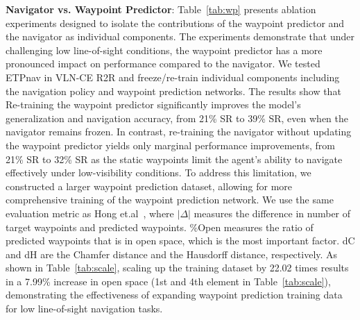 

\noindent\textbf{Navigator vs. Waypoint Predictor}:
Table~\ref{tab:wp} presents ablation experiments designed to isolate the contributions of the waypoint predictor and the navigator as individual components. The experiments demonstrate that under challenging low line-of-sight conditions, the waypoint predictor has a more pronounced impact on performance compared to the navigator. We tested ETPnav in VLN-CE R2R and freeze/re-train individual components including the navigation policy and waypoint prediction networks. The results show that Re-training the waypoint predictor significantly improves the model’s generalization and navigation accuracy, from 21\% SR to 39\% SR, even when the navigator remains frozen. In contrast, re-training the navigator without updating the waypoint predictor yields only marginal performance improvements, from 21\% SR to 32\% SR as the static waypoints limit the agent's ability to navigate effectively under low-visibility conditions. To address this limitation, we constructed a larger waypoint prediction dataset, allowing for more comprehensive training of the waypoint prediction network. We use the same evaluation metric as Hong et.al~\cite{hong2022bridging}, where $\mid$$\Delta$$\mid$ measures the difference in number of target waypoints and predicted waypoints. \%Open measures the ratio of predicted waypoints that is in open space, which is the most important factor. dC and dH are the Chamfer distance and the Hausdorff distance, respectively. As shown in Table~\ref{tab:scale}, scaling up the training dataset by 22.02 times results in a 7.99\% increase in open space (1st and 4th element in Table~\ref{tab:scale}), demonstrating the effectiveness of expanding waypoint prediction training data for low line-of-sight navigation tasks.




